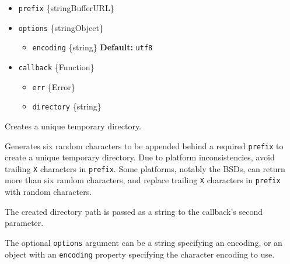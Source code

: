 \begin{itemize}
\tightlist
\item
  \texttt{prefix} \{string\textbar Buffer\textbar URL\}
\item
  \texttt{options} \{string\textbar Object\}

  \begin{itemize}
  \tightlist
  \item
    \texttt{encoding} \{string\} \textbf{Default:}
    \texttt{\textquotesingle{}utf8\textquotesingle{}}
  \end{itemize}
\item
  \texttt{callback} \{Function\}

  \begin{itemize}
  \tightlist
  \item
    \texttt{err} \{Error\}
  \item
    \texttt{directory} \{string\}
  \end{itemize}
\end{itemize}

Creates a unique temporary directory.

Generates six random characters to be appended behind a required
\texttt{prefix} to create a unique temporary directory. Due to platform
inconsistencies, avoid trailing \texttt{X} characters in
\texttt{prefix}. Some platforms, notably the BSDs, can return more than
six random characters, and replace trailing \texttt{X} characters in
\texttt{prefix} with random characters.

The created directory path is passed as a string to the callback's
second parameter.

The optional \texttt{options} argument can be a string specifying an
encoding, or an object with an \texttt{encoding} property specifying the
character encoding to use.

\begin{Shaded}
\begin{Highlighting}[]
 \OperatorTok{;}
 \OperatorTok{;}
 \OperatorTok{;}

\NormalTok{(}\NormalTok{(}\NormalTok{()}\OperatorTok{,} \NormalTok{)}\OperatorTok{,}\OperatorTok{,}\KeywordTok{=\textgreater{}}\NormalTok{ \{}
  \OperatorTok{;}
  \OperatorTok{;}
\NormalTok{\})}\OperatorTok{;}
\end{Highlighting}
\end{Shaded}

